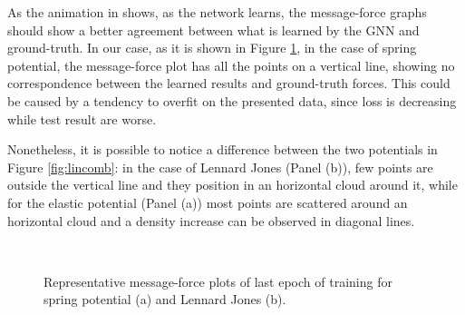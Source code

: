 \documentclass[../../master_thesis_np.tex]{subfiles}
\begin{document}
As the animation in \cite{cranmer_discovering_2020} shows, as the network learns, the message-force graphs should show a better agreement between what is learned by the GNN and ground-truth.
In our case, as it is shown in Figure \ref{fig:lincomb_last}, in the case of spring potential, the message-force plot has all the points on a vertical line, showing no correspondence between the learned results and ground-truth forces.
This could be caused by a tendency to overfit on the presented data, since loss is decreasing while test result are worse.


Nonetheless, it is possible to notice a difference between the two potentials in Figure \ref{fig:lincomb}: in the case of Lennard Jones (Panel (b)), few points are outside the vertical line and they position in an horizontal cloud around it, while for the elastic potential (Panel (a)) most points are scattered around an horizontal cloud and a density increase can be observed in diagonal lines.

\begin{figure}[tp]
	\centering
	\\
	\caption{Representative message-force plots of last epoch of training for spring potential (a) and Lennard Jones (b).}
	\label{fig:lincomb_last}
\end{figure}
\end{document}
